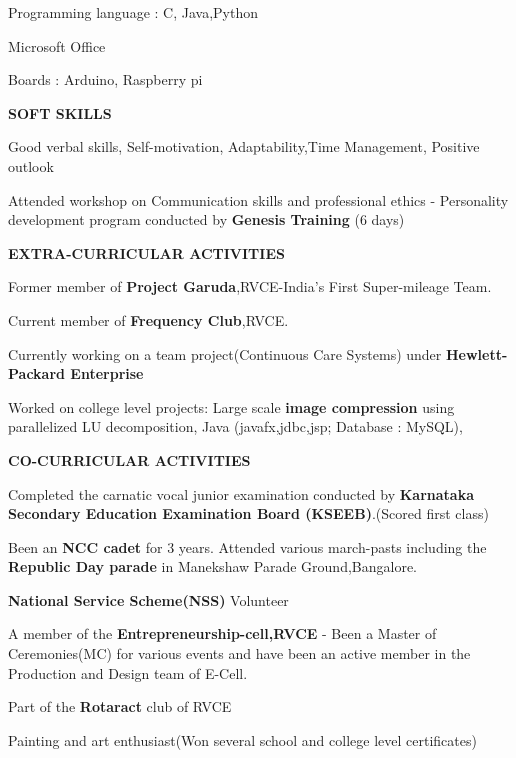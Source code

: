 \documentclass[letterpaper,11pt,oneside]{article}
\begin{document}
\begin{enumerate}
	\small {\item Programming language : C, Java,Python
		\item Microsoft Office
		\item Boards :  Arduino, Raspberry pi
	}
\end{enumerate}

\vspace{2ex}
\noindent\textbf{{\normalsize SOFT SKILLS}} 

\begin{enumerate}
	\small {\item Good verbal skills, Self-motivation, Adaptability,Time Management, Positive outlook
		\item Attended workshop on Communication skills and professional ethics - Personality development program conducted by \textbf{Genesis Training} (6 days)
	}
\end{enumerate}

\vspace{2ex}
\noindent\textbf{{\normalsize  EXTRA-CURRICULAR ACTIVITIES}} 

\begin{itemize}
	\small {\item Former member of \textbf{Project Garuda},RVCE-India's First Super-mileage Team.
		\item Current member of \textbf{Frequency Club},RVCE.
		\item Currently working on a team project(Continuous Care Systems) under \textbf{Hewlett-Packard Enterprise}
		\item Worked on college level projects: Large scale \textbf{image compression} using parallelized LU decomposition, Java (javafx,jdbc,jsp; Database : MySQL),\\}
\end{itemize}

\noindent\textbf{{\normalsize  CO-CURRICULAR ACTIVITIES}} 

\begin{enumerate}
	\small {\item Completed the carnatic vocal junior examination conducted by \textbf{Karnataka Secondary Education Examination Board (KSEEB)}.(Scored first class)
		\item Been an \textbf{NCC cadet} for 3 years. Attended various march-pasts including the \textbf{Republic Day parade} in Manekshaw Parade Ground,Bangalore.
		\item 	\textbf{National Service Scheme(NSS)} Volunteer
		\item	A member of the \textbf{Entrepreneurship-cell,RVCE} - Been a Master of Ceremonies(MC) for various events and have been an active member in the Production and Design team of E-Cell.
		\item Part of the \textbf{Rotaract} club of RVCE 
		\item  Painting and art enthusiast(Won several school and college level certificates)
	}
\end{enumerate}
\end{document}
